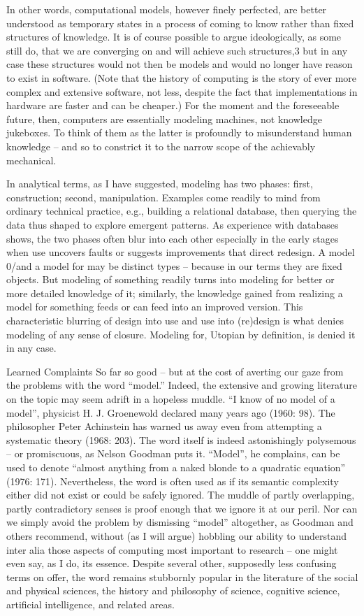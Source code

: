 In other words, computational models, however finely perfected, are
better understood as temporary states in a process of coming to know
rather than fixed structures of knowledge. It is of course possible to
argue ideologically, as some still do, that we are converging on and
will achieve such structures,3 but in any case these structures would
not then be models and would no longer have reason to exist in software.
(Note that the history of computing is the story of ever more complex
and extensive software, not less, despite the fact that implementations
in hardware are faster and can be cheaper.) For the moment and the
foreseeable future, then, computers are essentially modeling machines,
not knowledge jukeboxes. To think of them as the latter is profoundly to
misunderstand human knowledge -- and so to constrict it to the narrow
scope of the achievably mechanical.

In analytical terms, as I have suggested, modeling has two phases:
first, construction; second, manipulation. Examples come readily to mind
from ordinary technical practice, e.g., building a relational database,
then querying the data thus shaped to explore emergent patterns. As
experience with databases shows, the two phases often blur into each
other especially in the early stages when use uncovers faults or
suggests improvements that direct redesign. A model 0/and a model for
may be distinct types -- because in our terms they are fixed objects.
But modeling of something readily turns into modeling for better or more
detailed knowledge of it; similarly, the knowledge gained from realizing
a model for something feeds or can feed into an improved version. This
characteristic blurring of design into use and use into (re)design is
what denies modeling of any sense of closure. Modeling for, Utopian by
definition, is denied it in any case.

Learned Complaints So far so good -- but at the cost of averting our
gaze from the problems with the word ``model.'' Indeed, the extensive
and growing literature on the topic may seem adrift in a hopeless
muddle. ``I know of no model of a model'', physicist H. J. Groenewold
declared many years ago (1960: 98). The philosopher Peter Achinstein has
warned us away even from attempting a systematic theory (1968: 203). The
word itself is indeed astonishingly polysemous -- or promiscuous, as
Nelson Goodman puts it. ``Model'', he complains, can be used to denote
``almost anything from a naked blonde to a quadratic equation'' (1976:
171). Nevertheless, the word is often used as if its semantic complexity
either did not exist or could be safely ignored. The muddle of partly
overlapping, partly contradictory senses is proof enough that we ignore
it at our peril. Nor can we simply avoid the problem by dismissing
``model'' altogether, as Goodman and others recommend, without (as I
will argue) hobbling our ability to understand inter alia those aspects
of computing most important to research -- one might even say, as I do,
its essence. Despite several other, supposedly less confusing terms on
offer, the word remains stubbornly popular in the literature of the
social and physical sciences, the history and philosophy of science,
cognitive science, artificial intelligence, and related areas.

